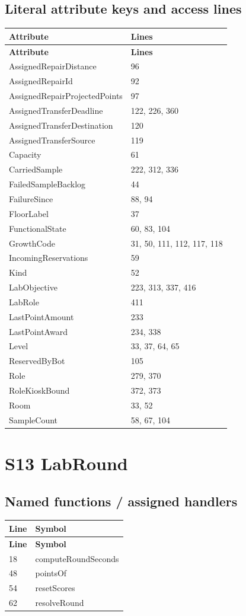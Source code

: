 \subsection{Literal attribute keys and access lines}
\begin{longtable}{p{}p{}}
\toprule
\textbf{Attribute} & \textbf{Lines} \\ \midrule
\endfirsthead
\textbf{Attribute} & \textbf{Lines} \\ \midrule
\endhead
AssignedRepairDistance & 96 \\
AssignedRepairId & 92 \\
AssignedRepairProjectedPoints & 97 \\
AssignedTransferDeadline & 122, 226, 360 \\
AssignedTransferDestination & 120 \\
AssignedTransferSource & 119 \\
Capacity & 61 \\
CarriedSample & 222, 312, 336 \\
FailedSampleBacklog & 44 \\
FailureSince & 88, 94 \\
FloorLabel & 37 \\
FunctionalState & 60, 83, 104 \\
GrowthCode & 31, 50, 111, 112, 117, 118 \\
IncomingReservations & 59 \\
Kind & 52 \\
LabObjective & 223, 313, 337, 416 \\
LabRole & 411 \\
LastPointAmount & 233 \\
LastPointAward & 234, 338 \\
Level & 33, 37, 64, 65 \\
ReservedByBot & 105 \\
Role & 279, 370 \\
RoleKioskBound & 372, 373 \\
Room & 33, 52 \\
SampleCount & 58, 67, 104 \\
\bottomrule
\end{longtable}
\section{S13 LabRound}
\subsection{Named functions /\allowbreak{} assigned handlers}
\begin{longtable}{p{}p{}}
\toprule
\textbf{Line} & \textbf{Symbol} \\ \midrule
\endfirsthead
\textbf{Line} & \textbf{Symbol} \\ \midrule
\endhead
18 & computeRoundSeconds \\
48 & pointsOf \\
54 & resetScores \\
62 & resolveRound \\
\bottomrule
\end{longtable}
